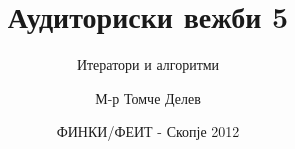 

\author[АВ5]{М-р Томче Делев}
\title[Софтверско инженерство]{Аудиториски вежби 5}
\subtitle{Итератори и алгоритми}
\date{ФИНКИ/ФЕИТ - Скопје 2012}





\frame[t,plain]{\titlepage}









